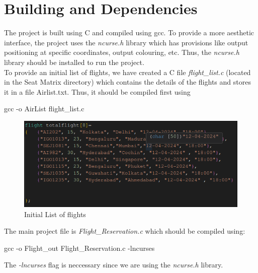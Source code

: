 \documentclass[a4paper]{scrartcl}
\begin{document}
\section{Building and Dependencies}
The project is built using C and compiled using gcc. To provide a more aesthetic interface, the project uses the \textit{ncurse.h} library which has provisions like output positioning at specific coordinates, output colouring, etc. Thus, the \textit{ncurse.h} library should be installed to run the project.\\[0.3cm]
To provide an initial list of flights, we have created a C file \textit{flight\_list.c} (located in the Seat Matrix directory) which contains the details of the flights and stores it in a file Airlist.txt. Thus, it should be compiled first using 
\begin{center}
    gcc -o AirList flight\_list.c
\end{center}
\begin{figure}[H]
    \centering
    \includegraphics[scale=0.5]{initial.png}
    \caption{Initial List of flights}
\end{figure}
The main project file is \textit{Flight\_Reservation.c} which should be compiled using: 
\begin{center}
    gcc -o Flight\_out Flight\_Reservation.c -lncurses
\end{center}
The \textit{-lncurses} flag is neccessary since we are using the \textit{ncurse.h} library.\\[0.3cm]
\end{document}
